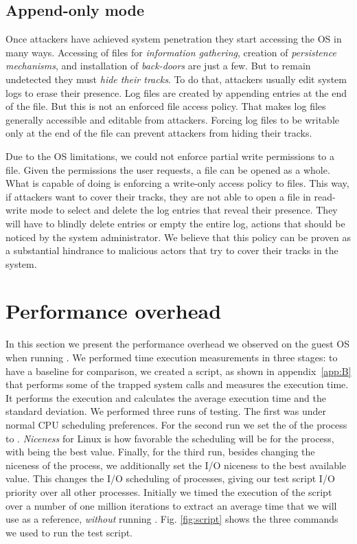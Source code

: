 \subsection{Append-only mode}

\par Once attackers have achieved system penetration they start accessing the \ac{OS} in many ways. Accessing of files for \emph{information gathering}, creation of \emph{persistence mechanisms}, and installation of \emph{back-doors} are just a few. But to remain undetected they must \emph{hide their tracks}. To do that, attackers usually edit system logs to erase their presence. Log files are created by appending entries at the end of the file. But this is not an enforced file access policy. That makes log files generally accessible and editable from attackers. Forcing log files to be writable only at the end of the file can prevent attackers from hiding their tracks.

\par Due to the \ac{OS} limitations, we could not enforce partial write permissions to a file. Given the permissions the user requests, a file can be opened as a whole. What  is capable of doing is enforcing a write-only access policy to files. This way, if attackers want to cover their tracks, they are not able to open a file in read-write mode to select and delete the log entries that reveal their presence. They will have to blindly delete entries or empty the entire log, actions that should be noticed by the system administrator. We believe that this policy can be proven as a substantial hindrance to malicious actors that try to cover their tracks in the system.

\section{Performance overhead}\label{sec:performance}

In this section we present the performance overhead we observed on the guest \ac{OS} when running . We performed time execution measurements in three stages: to have a baseline for comparison, we created a  script, as shown in appendix~\ref{app:B} that performs some of the trapped system calls and measures the execution time. It performs the execution and calculates the average execution time and the standard deviation. We performed three runs of testing. The first was under normal \ac{CPU} scheduling preferences. For the second run we set the  of the process to . \emph{Niceness} for Linux is how favorable the scheduling will be for the process, with  being the best value. Finally, for the third run, besides changing the niceness of the process, we additionally set the I/O niceness to the best available value. This changes the I/O scheduling of processes, giving our test script I/O priority over all other processes. Initially we timed the execution of the script over a number of one million iterations to extract an average time that we will use as a reference, \emph{without} running . Fig. \ref{fig:script} shows the three commands we used to run the test script.

